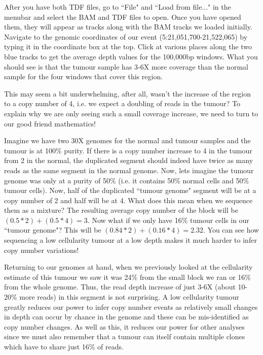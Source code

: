 After you have both TDF files, go to ``File" and ``Load from file..." in the menubar and select the BAM and TDF files to open. Once you have opened them, they will appear as tracks along with the BAM tracks we loaded initially. Navigate to the genomic coordinates of our event (5:21,051,700-21,522,065) by typing it in the coordinate box at the top. Click at various places along the two blue tracks to get the average depth values for the 100,000bp windows. What you should see is that the tumour sample has 3-6X more coverage than the normal sample for the four windows that cover this region.

This may seem a bit underwhelming, after all, wasn't the increase of the region to a copy number of 4, i.e. we expect a doubling of reads in the tumour? To explain why we are only seeing such a small coverage increase, we need to turn to our good friend mathematics!

Imagine we have two 30X genomes for the normal and tumour samples and the tumour is at 100\% purity. If there is a copy number increase to 4 in the tumour from 2 in the normal, the duplicated segment should indeed have twice as many reads as the same segment in the normal genome. Now, lets imagine the tumour genome was only at a purity of 50\% (i.e. it contains 50\% normal cells and 50\% tumour cells). Now, half of the duplicated ``tumour genome" segment will be at a copy number of 2 and half will be at 4. What does this mean when we sequence them as a mixture? The resulting average copy number of the block will be $(0.5*2)+(0.5*4) = 3$. Now what if we only have 16\% tumour cells in our ``tumour genome"? This will be $(0.84*2)+(0.16*4) = 2.32$. You can see how sequencing a low cellularity tumour at a low depth makes it much harder to infer copy number variations!

Returning to our genomes at hand, when we previously looked at the cellularity estimate of this tumour we saw it was 24\% from the small block we ran or 16\% from the whole genome. Thus, the read depth increase of just 3-6X (about 10-20\% more reads) in this segment is not surprising. A low cellularity tumour greatly reduces our power to infer copy number events as relatively small changes in depth can occur by chance in the genome and these can be mis-identified as copy number changes. As well as this, it reduces our power for other analyses since we must also remember that a tumour can itself contain multiple clones which have to share just 16\% of reads.\\

